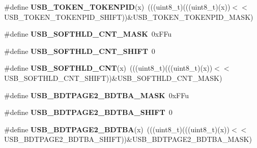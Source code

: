 \begin{DoxyCompactItemize}
\item 
\#define {\bfseries U\+S\+B\+\_\+\+T\+O\+K\+E\+N\+\_\+\+T\+O\+K\+E\+N\+P\+ID}(x)~(((uint8\+\_\+t)(((uint8\+\_\+t)(x))$<$$<$U\+S\+B\+\_\+\+T\+O\+K\+E\+N\+\_\+\+T\+O\+K\+E\+N\+P\+I\+D\+\_\+\+S\+H\+I\+FT))\&U\+S\+B\+\_\+\+T\+O\+K\+E\+N\+\_\+\+T\+O\+K\+E\+N\+P\+I\+D\+\_\+\+M\+A\+SK)\hypertarget{group__USB__Register__Masks_ga74fd206a0132343b30c41a2184f18ea0}{}\label{group__USB__Register__Masks_ga74fd206a0132343b30c41a2184f18ea0}

\item 
\#define {\bfseries U\+S\+B\+\_\+\+S\+O\+F\+T\+H\+L\+D\+\_\+\+C\+N\+T\+\_\+\+M\+A\+SK}~0x\+F\+Fu\hypertarget{group__USB__Register__Masks_gab71f8a7be8b025453facbce8d45b7bcc}{}\label{group__USB__Register__Masks_gab71f8a7be8b025453facbce8d45b7bcc}

\item 
\#define {\bfseries U\+S\+B\+\_\+\+S\+O\+F\+T\+H\+L\+D\+\_\+\+C\+N\+T\+\_\+\+S\+H\+I\+FT}~0\hypertarget{group__USB__Register__Masks_gaf4b663b6276ba642abfdedf79fac92c6}{}\label{group__USB__Register__Masks_gaf4b663b6276ba642abfdedf79fac92c6}

\item 
\#define {\bfseries U\+S\+B\+\_\+\+S\+O\+F\+T\+H\+L\+D\+\_\+\+C\+NT}(x)~(((uint8\+\_\+t)(((uint8\+\_\+t)(x))$<$$<$U\+S\+B\+\_\+\+S\+O\+F\+T\+H\+L\+D\+\_\+\+C\+N\+T\+\_\+\+S\+H\+I\+FT))\&U\+S\+B\+\_\+\+S\+O\+F\+T\+H\+L\+D\+\_\+\+C\+N\+T\+\_\+\+M\+A\+SK)\hypertarget{group__USB__Register__Masks_ga6a373b5dfe5c4aa910fd120cc169a4b9}{}\label{group__USB__Register__Masks_ga6a373b5dfe5c4aa910fd120cc169a4b9}

\item 
\#define {\bfseries U\+S\+B\+\_\+\+B\+D\+T\+P\+A\+G\+E2\+\_\+\+B\+D\+T\+B\+A\+\_\+\+M\+A\+SK}~0x\+F\+Fu\hypertarget{group__USB__Register__Masks_ga69407c90a73a26bc60f3f9b75e4bd7c0}{}\label{group__USB__Register__Masks_ga69407c90a73a26bc60f3f9b75e4bd7c0}

\item 
\#define {\bfseries U\+S\+B\+\_\+\+B\+D\+T\+P\+A\+G\+E2\+\_\+\+B\+D\+T\+B\+A\+\_\+\+S\+H\+I\+FT}~0\hypertarget{group__USB__Register__Masks_gae67d0252b1559f854264f0fe52ff6fb5}{}\label{group__USB__Register__Masks_gae67d0252b1559f854264f0fe52ff6fb5}

\item 
\#define {\bfseries U\+S\+B\+\_\+\+B\+D\+T\+P\+A\+G\+E2\+\_\+\+B\+D\+T\+BA}(x)~(((uint8\+\_\+t)(((uint8\+\_\+t)(x))$<$$<$U\+S\+B\+\_\+\+B\+D\+T\+P\+A\+G\+E2\+\_\+\+B\+D\+T\+B\+A\+\_\+\+S\+H\+I\+FT))\&U\+S\+B\+\_\+\+B\+D\+T\+P\+A\+G\+E2\+\_\+\+B\+D\+T\+B\+A\+\_\+\+M\+A\+SK)\hypertarget{group__USB__Register__Masks_ga1b7b12b3e6686e4b15b1cfa072a805eb}{}\label{group__USB__Register__Masks_ga1b7b12b3e6686e4b15b1cfa072a805eb}


\end{DoxyCompactItemize}
